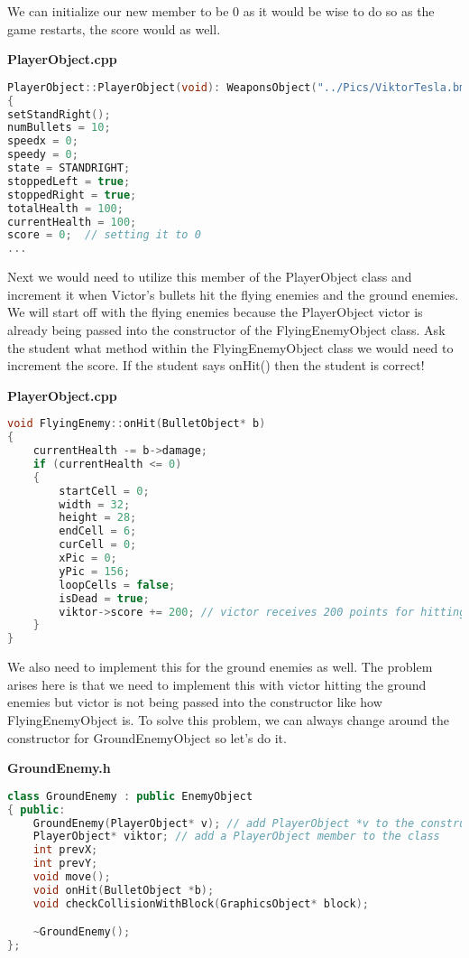 \documentclass[11pt]{article}
\begin{document}
\bigskip 

We can initialize our new member to be 0 as it would be wise to do so as the game restarts, the score would as well. 

\bigskip 
\clearpage
\textbf{PlayerObject.cpp}
\smallskip
\begin{lstlisting}[language=C++]  
PlayerObject::PlayerObject(void): WeaponsObject("../Pics/ViktorTesla.bmp", 100, 100)
{
setStandRight();
numBullets = 10;
speedx = 0;
speedy = 0;
state = STANDRIGHT;
stoppedLeft = true;
stoppedRight = true;
totalHealth = 100;
currentHealth = 100;
score = 0;  // setting it to 0 
...
\end{lstlisting}

\bigskip

Next we would need to utilize this member of the PlayerObject class and increment it when Victor's bullets hit the flying enemies and the ground enemies. We will start off with the flying enemies because the PlayerObject victor is already being passed into the constructor of the FlyingEnemyObject class. Ask the student what method within the FlyingEnemyObject class we would need to increment the score. If the student says onHit() then the student is correct!  
 
\bigskip
\textbf{PlayerObject.cpp}
\smallskip

\begin{lstlisting}[language=C++]  
void FlyingEnemy::onHit(BulletObject* b)
{
	currentHealth -= b->damage;
	if (currentHealth <= 0)
	{
		startCell = 0;
		width = 32;
		height = 28;
		endCell = 6;
		curCell = 0;
		xPic = 0;
		yPic = 156;
		loopCells = false;
		isDead = true;
		viktor->score += 200; // victor receives 200 points for hitting a flying enemy
	}
}
\end{lstlisting} 

\bigskip

We also need to implement this for the ground enemies as well. The problem arises here is that we need to implement this with victor hitting the ground enemies but victor is not being passed into the constructor like how FlyingEnemyObject is. To solve this problem, we can always change around the constructor for GroundEnemyObject so let's do it. 

\bigskip
\textbf{GroundEnemy.h}
\smallskip

\begin{lstlisting}[language=C++]  
class GroundEnemy : public EnemyObject
{ public:
	GroundEnemy(PlayerObject* v); // add PlayerObject *v to the constructor    
	PlayerObject* viktor; // add a PlayerObject member to the class
	int prevX;
	int prevY;
	void move();
	void onHit(BulletObject *b);
	void checkCollisionWithBlock(GraphicsObject* block);

	~GroundEnemy();
};
\end{lstlisting}  
\end{document}
